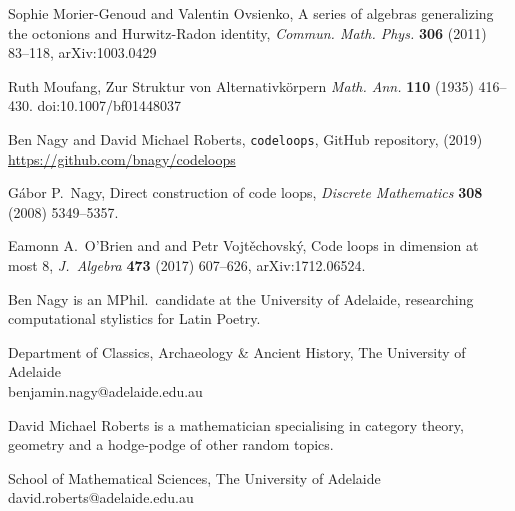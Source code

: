 \documentclass{article}
\theoremstyle{plain}
\theoremstyle{definition}
\begin{document}
\begin{thebibliography}{1}
 Sophie Morier-Genoud and Valentin Ovsienko, A series of algebras generalizing the octonions and Hurwitz-Radon identity, \emph{Commun. Math. Phys.} \textbf{306} (2011) 83--118, arXiv:1003.0429

 Ruth Moufang, Zur Struktur von Alternativk\"orpern \emph{Math. Ann.} \textbf{110} (1935) 416--430. doi:10.1007/bf01448037

 Ben Nagy and David Michael Roberts, \texttt{codeloops}, GitHub repository, (2019) \url{https://github.com/bnagy/codeloops}

 G\'abor P.\ Nagy, Direct construction of code loops, \emph{Discrete Mathematics} \textbf{308} (2008) 5349--5357.

 Eamonn A.\ O'Brien and and Petr Vojt\v{e}chovsk\'{y}, Code loops in dimension at most 8, \emph{J.\ Algebra} \textbf{473} (2017) 607--626, arXiv:1712.06524.

\end{thebibliography}

\begin{biog}
\item[Ben Nagy] is an MPhil.\ candidate at the University of Adelaide, researching computational stylistics for Latin Poetry.
\begin{affil}
Department of Classics, Archaeology \& Ancient History, The University of Adelaide\\
benjamin.nagy@adelaide.edu.au
\end{affil}

\item[David Michael Roberts] is a mathematician specialising in category theory, geometry and a hodge-podge of other random topics.
\begin{affil}
School of Mathematical Sciences, The University of Adelaide\\
david.roberts@adelaide.edu.au
\end{affil}
\end{biog}
\vfill\eject
\end{document}
